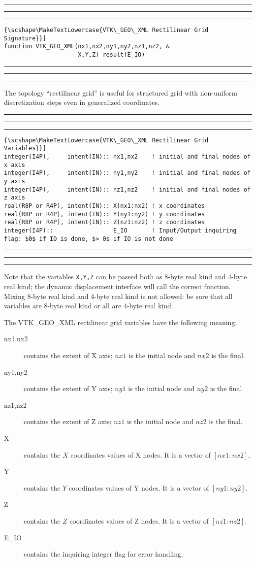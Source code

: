 \documentclass[pagesize=pdftex,fontsize=10pt,paper=a4,oneside]{scrbook}
\DeclareRobustCommand{\MarginNote}[1]{\marginpar{%
\slshape\footnotesize%
\parindent=0pt\lineskip=0pt\lineskiplimit=0pt%
\tolerance=2000\hyphenpenalty=300\exhyphenpenalty=300%
\doublehyphendemerits=100000\finalhyphendemerits=\doublehyphendemerits%
\raggedright\hspace{0pt}#1}}
\newenvironment{boxred}[1]%
               {%
                \noindent\hspace*{-0.025\textwidth}%
                \color{Maroon}%
                \rule[-5.8pt]{0.6pt}{6pt}\hspace*{-0.6pt}\rule{1.05\textwidth}{0.6pt}\hspace*{-0.6pt}\rule[-5.8pt]{0.6pt}{6pt}%
                \color{black}%
                \vspace*{0.6pt}\MarginNote{\color{Maroon}{#1}}%
               }%
               {%
                \noindent\hspace*{-0.025\textwidth}%
                \color{Maroon}%
                \rule[0pt]{0.6pt}{6pt}\hspace*{-0.6pt}\rule{1.05\textwidth}{0.6pt}\hspace*{-0.6pt}\rule[0pt]{0.6pt}{6pt}%
                \color{black}%
                \vspace*{2mm}%
               }
\newcommand{\virgo}[1]{``{#1}''}
\DeclareRobustCommand{\MaiuscolettoBS}[1]{\textls[80]{\scshape\MakeTextLowercase{#1}}}
\begin{document}
\begin{boxred}{}
\begin{lstlisting}[style=signature,title=\color{Maroon}\MaiuscolettoBS{VTK\_GEO\_XML Rectilinear Grid Signature}]
function VTK_GEO_XML(nx1,nx2,ny1,ny2,nz1,nz2, &
                     X,Y,Z) result(E_IO)
\end{lstlisting}
\end{boxred}

The topology \virgo{rectilinear grid} is useful for structured grid with non-uniform discretization steps even in
generalized coordinates.

\begin{boxred}{}
\begin{lstlisting}[style=variables,title=\color{Maroon}\MaiuscolettoBS{VTK\_GEO\_XML Rectilinear Grid Variables}]
integer(I4P),     intent(IN):: nx1,nx2    ! initial and final nodes of x axis
integer(I4P),     intent(IN):: ny1,ny2    ! initial and final nodes of y axis
integer(I4P),     intent(IN):: nz1,nz2    ! initial and final nodes of z axis
real(R8P or R4P), intent(IN):: X(nx1:nx2) ! x coordinates
real(R8P or R4P), intent(IN):: Y(ny1:ny2) ! y coordinates
real(R8P or R4P), intent(IN):: Z(nz1:nz2) ! z coordinates
integer(I4P)::                 E_IO       ! Input/Output inquiring flag: $0$ if IO is done, $> 0$ if IO is not done
\end{lstlisting}
\end{boxred}

Note that the variables \texttt{X,Y,Z} can be passed both as 8-byte real kind and 4-byte real kind; the dynamic
displacement interface will call the correct function. Mixing 8-byte real kind and 4-byte real kind is not allowed: be sure
that all variables are 8-byte real kind or all are 4-byte real kind.

The VTK\_GEO\_XML rectilinear grid variables have the following meaning:

\begin{description}
 \item[{\color{RoyalBlue}nx1,nx2}] contains the extent of X axis; $nx1$ is the initial node and $nx2$ is the final.
 \item[{\color{RoyalBlue}ny1,ny2}] contains the extent of Y axis; $ny1$ is the initial node and $ny2$ is the final.
 \item[{\color{RoyalBlue}nz1,nz2}] contains the extent of Z axis; $nz1$ is the initial node and $nz2$ is the final.
 \item[{\color{RoyalBlue}X}] contains the $X$ coordinates values of X nodes. It is a vector of $[nx1:nx2]$.
 \item[{\color{RoyalBlue}Y}] contains the $Y$ coordinates values of Y nodes. It is a vector of $[ny1:ny2]$.
 \item[{\color{RoyalBlue}Z}] contains the $Z$ coordinates values of Z nodes. It is a vector of $[nz1:nz2]$.
 \item[{\color{RoyalBlue}E\_IO}] contains the inquiring integer flag for error handling.
\end{description}
\end{document}
